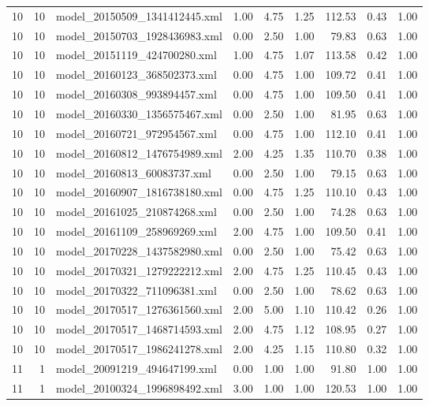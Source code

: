 \begin{table}[ht]
\begin{tabular}{rrlrrrrrr}
   10 &  10 & model\_20150509\_1341412445.xml & 1.00 & 4.75 & 1.25 & 112.53 & 0.43 & 1.00 \\ 
   10 &  10 & model\_20150703\_1928436983.xml & 0.00 & 2.50 & 1.00 & 79.83 & 0.63 & 1.00 \\ 
   10 &  10 & model\_20151119\_424700280.xml & 1.00 & 4.75 & 1.07 & 113.58 & 0.42 & 1.00 \\ 
   10 &  10 & model\_20160123\_368502373.xml & 0.00 & 4.75 & 1.00 & 109.72 & 0.41 & 1.00 \\ 
   10 &  10 & model\_20160308\_993894457.xml & 0.00 & 4.75 & 1.00 & 109.50 & 0.41 & 1.00 \\ 
   10 &  10 & model\_20160330\_1356575467.xml & 0.00 & 2.50 & 1.00 & 81.95 & 0.63 & 1.00 \\ 
   10 &  10 & model\_20160721\_972954567.xml & 0.00 & 4.75 & 1.00 & 112.10 & 0.41 & 1.00 \\ 
   10 &  10 & model\_20160812\_1476754989.xml & 2.00 & 4.25 & 1.35 & 110.70 & 0.38 & 1.00 \\ 
   10 &  10 & model\_20160813\_60083737.xml & 0.00 & 2.50 & 1.00 & 79.15 & 0.63 & 1.00 \\ 
   10 &  10 & model\_20160907\_1816738180.xml & 0.00 & 4.75 & 1.25 & 110.10 & 0.43 & 1.00 \\ 
   10 &  10 & model\_20161025\_210874268.xml & 0.00 & 2.50 & 1.00 & 74.28 & 0.63 & 1.00 \\ 
   10 &  10 & model\_20161109\_258969269.xml & 2.00 & 4.75 & 1.00 & 109.50 & 0.41 & 1.00 \\ 
   10 &  10 & model\_20170228\_1437582980.xml & 0.00 & 2.50 & 1.00 & 75.42 & 0.63 & 1.00 \\ 
   10 &  10 & model\_20170321\_1279222212.xml & 2.00 & 4.75 & 1.25 & 110.45 & 0.43 & 1.00 \\ 
   10 &  10 & model\_20170322\_711096381.xml & 0.00 & 2.50 & 1.00 & 78.62 & 0.63 & 1.00 \\ 
   10 &  10 & model\_20170517\_1276361560.xml & 2.00 & 5.00 & 1.10 & 110.42 & 0.26 & 1.00 \\ 
   10 &  10 & model\_20170517\_1468714593.xml & 2.00 & 4.75 & 1.12 & 108.95 & 0.27 & 1.00 \\ 
   10 &  10 & model\_20170517\_1986241278.xml & 2.00 & 4.25 & 1.15 & 110.80 & 0.32 & 1.00 \\ 
   11 &   1 & model\_20091219\_494647199.xml & 0.00 & 1.00 & 1.00 & 91.80 & 1.00 & 1.00 \\ 
   11 &   1 & model\_20100324\_1996898492.xml & 3.00 & 1.00 & 1.00 & 120.53 & 1.00 & 1.00 \\ 

\end{tabular}
\end{table}
